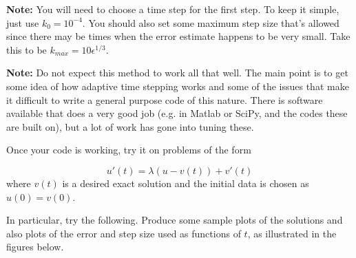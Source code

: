 \documentclass[10pt]{article}
\begin{document}
{\bf Note:} You will need to choose a time step for the first step.  To keep
it simple, just use $k_0 = 10^{-4}$.   You should also set some maximum
step size that's allowed since there may be times when the error estimate
happens to be very small.  Take this to be $k_{max} = 10 \epsilon^{1/3}$.

{\bf Note:} Do not expect this method to work all that well.  The main point
is to get some idea of how adaptive time stepping works and some of the
issues that make it difficult to write a general purpose code of this
nature.  There is software available that does a very good job (e.g. in
Matlab or SciPy, and the codes these are built on), but a lot of
work has gone into tuning these.


Once your code is working, try it on problems of the form

\begin{equation}\label{fuv}
u'(t) = \lambda (u - v(t)) + v'(t)
\end{equation} 
where $v(t)$ is a desired exact solution and the initial data is chosen as 
$u(0) = v(0)$.

In particular, try the following.  Produce some sample plots of the
solutions and also plots of the error and step size used as functions of
$t$, as illustrated in the figures below.
\end{document}
